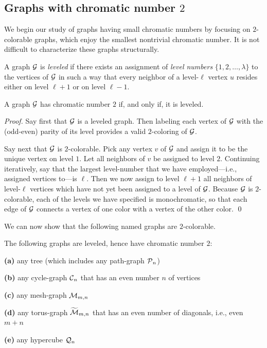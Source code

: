 \subsection{Graphs with chromatic number $2$}
\label{sec:2-color-graphs}

We begin our study of graphs having small chromatic numbers by focusing on
$2$-colorable graphs, which enjoy the smallest nontrivial chromatic number.
It is not difficult to characterize these graphs structurally.

A graph $\mbox{$\cal G$}$ is {\it leveled}  if there exists
an assignment of {\it level numbers} $\{ 1, 2, \ldots, \lambda\}$ to the
vertices of $\mbox{$\cal G$}$ in such a way that every neighbor of a level-$\ell$ vertex
$u$ resides either on level $\ell +1$ or on level $\ell -1$.

\begin{prop}
\label{thm:leveled=2-color}
A graph $\mbox{$\cal G$}$ has chromatic number $2$ if, and only if, it is leveled.
\end{prop}

\begin{proof}
Say first that $\mbox{$\cal G$}$ is a leveled graph.  Then labeling each vertex of
$\mbox{$\cal G$}$ with the (odd-even) parity of its level provides a valid
$2$-coloring of $\mbox{$\cal G$}$.

Say next that $\mbox{$\cal G$}$ is $2$-colorable.  Pick any vertex $v$ of $\mbox{$\cal G$}$ and
assign it to be the unique vertex on level $1$.  Let all neighbors of
$v$ be assigned to level $2$.  Continuing iteratively, say that the
largest level-number that we have employed---i.e., assigned vertices
to---is $\ell$.  Then we now assign to level $\ell +1$ all neighbors
of level-$\ell$ vertices which have not yet been assigned to a level of
$\mbox{$\cal G$}$.  Because $\mbox{$\cal G$}$ is $2$-colorable, each of the levels we have
specified is monochromatic, so that each edge of $\mbox{$\cal G$}$ connects a vertex
of one color with a vertex of the other color.  \qed
\end{proof}

We can now show that the following named graphs are $2$-colorable.

\begin{corol}
\label{thm:list-2-colorables}
The following graphs are leveled, hence have chromatic number $2$:

{\bf (a)}
any tree (which includes any path-graph $\mbox{$\cal P$}_n$)

{\bf (b)}
any cycle-graph $\mbox{$\cal C$}_n$ that has an even number $n$ of vertices

{\bf (c)}
any mesh-graph $\mbox{$\cal M$}_{m,n}$

{\bf (d)}
any torus-graph $\widetilde{\mbox{$\cal M$}}_{m,n}$ that has an even number of
diagonals, i.e., even $m+n$

{\bf (e)}
any hypercube $\mbox{$\cal Q$}_n$
\end{corol}

